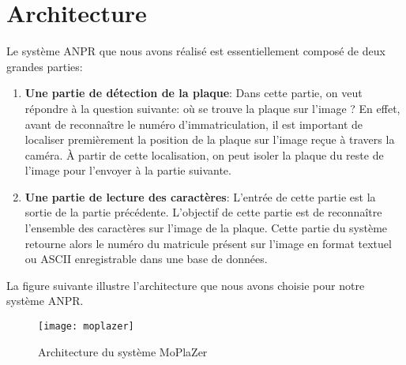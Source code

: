 \section{Architecture}
Le système ANPR que nous avons réalisé est essentiellement composé de deux grandes parties:
    \begin{enumerate}
        \item \textbf{Une partie de détection de la plaque}: Dans cette partie, on veut répondre à la question suivante: où se trouve la plaque sur l'image ? En effet, avant de reconnaître le numéro d'immatriculation, il est important de localiser premièrement la position de la plaque sur l'image reçue à travers la caméra. À partir de cette localisation, on peut isoler la plaque du reste de l'image pour l'envoyer à la partie suivante.
        \item \textbf{Une partie de lecture des caractères}: L'entrée de cette partie est la sortie de la partie précédente. L'objectif de cette partie est de reconnaître l'ensemble des caractères sur l'image de la plaque. Cette partie du système retourne alors le numéro du matricule présent sur l'image en format textuel ou ASCII enregistrable dans une base de données.
    \end{enumerate}
    La figure suivante illustre l'architecture que nous avons choisie pour notre système ANPR.
    \begin{figure}[H]
        \texttt{[image: moplazer]}
        \caption{Architecture du système MoPlaZer}
    \end{figure}